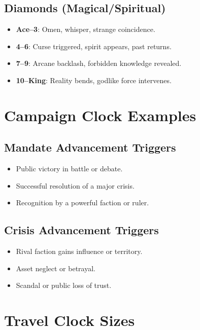 \subsection*{Diamonds (Magical/Spiritual)}

\begin{itemize}
    \item \textbf{Ace--3}: Omen, whisper, strange coincidence.
    \item \textbf{4--6}: Curse triggered, spirit appears, past returns.
    \item \textbf{7--9}: Arcane backlash, forbidden knowledge revealed.
    \item \textbf{10--King}: Reality bends, godlike force intervenes.
\end{itemize}

\section*{Campaign Clock Examples}

\subsection*{Mandate Advancement Triggers}

\begin{itemize}
    \item Public victory in battle or debate.
    \item Successful resolution of a major crisis.
    \item Recognition by a powerful faction or ruler.
\end{itemize}

\subsection*{Crisis Advancement Triggers}

\begin{itemize}
    \item Rival faction gains influence or territory.
    \item Asset neglect or betrayal.
    \item Scandal or public loss of trust.
\end{itemize}

\section*{Travel Clock Sizes}

